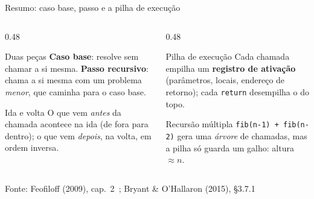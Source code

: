 \documentclass[aspectratio=169]{beamer}
\newcommand{\fonte}[1]{\vfill\hfill{\scriptsize\textcolor{UFSGray}{Fonte: #1}}}
\begin{document}
\begin{frame}{Resumo: caso base, passo e a pilha de execução}
  \begin{columns}[T]
    \begin{column}{0.48\textwidth}
      \begin{block}{Duas peças}
        \small \textbf{Caso base}: resolve sem chamar a si mesma.
        \textbf{Passo recursivo}: chama a si mesma com um problema
        \emph{menor}, que caminha para o caso base.
      \end{block}
      \begin{block}{Ida e volta}
        \small O que vem \emph{antes} da chamada acontece na ida (de fora
        para dentro); o que vem \emph{depois}, na volta, em ordem inversa.
      \end{block}
    \end{column}
    \begin{column}{0.48\textwidth}
      \begin{block}{Pilha de execução}
        \small Cada chamada empilha um \textbf{registro de ativação}
        (parâmetros, locais, endereço de retorno); cada \texttt{return}
        desempilha o do topo.
      \end{block}
      \begin{exampleblock}{Recursão múltipla}
        \small \texttt{fib(n-1) + fib(n-2)} gera uma \emph{árvore} de
        chamadas, mas a pilha só guarda um galho: altura $\approx n$.
      \end{exampleblock}
    \end{column}
  \end{columns}
  \fonte{Feofiloff (2009), cap.~2~\cite{feofiloff2009algoritmos}; Bryant \& O'Hallaron (2015), §3.7.1~\cite{bryant2015computer}}
\end{frame}
\end{document}
